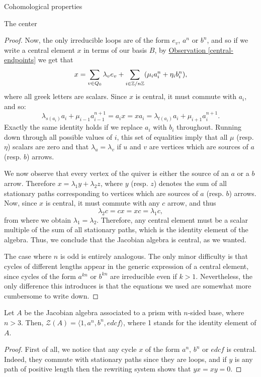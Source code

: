 \begin{chapter}{Cohomological properties}
\begin{section}{The center}
\begin{proof}
Now, the only irreducible loops are of the form $e_v$, $a^n$ or $b^n$, and so if we write a central element $x$ in terms of our basis $B$, by \hyperref[central-endpoints]{Observation \ref*{central-endpoints}} we get that
\[x = \sum_{v\in Q_0} \lambda_v e_v + \sum_{i\in \mathbb{Z}/n\mathbb{Z}}(\mu_i a_i^n + \eta_i b_i^n),\]
where all greek letters are scalars. Since $x$ is central, it must commute with $a_i$, and so:
\[\lambda_{s(a_i)}a_i + \mu_{i-1} a_{i-1}^{n+1}=a_ix = xa_i = \lambda_{t(a_i)}a_i + \mu_{i+1} a_i^{n+1}.\]
Exactly the same identity holds if we replace $a_i$ with $b_i$ throughout. Running down through all possible values of $i$, this set of equalities imply that all $\mu$ (resp. $\eta$) scalars are zero and that $\lambda_u=\lambda_v$ if $u$ and $v$ are vertices which are sources of $a$ (resp. $b$) arrows.

We now observe that every vertex of the quiver is either the source of an $a$ or a $b$ arrow. Therefore $x=\lambda_1 y + \lambda_2 z$, where $y$ (resp. $z$) denotes the sum of all stationary paths corresponding to vertices which are sources of $a$ (resp. $b$) arrows. Now, since $x$ is central, it must commute with any $c$ arrow, and thus
\[\lambda_2 c = cx = xc = \lambda_1 c,\]
from where we obtain $\lambda_1=\lambda_2$. Therefore, any central element must be a scalar multiple of the sum of all stationary paths, which is the identity element of the algebra. Thus, we conclude that the Jacobian algebra is central, as we wanted.

The case where $n$ is odd is entirely analogous. The only minor difficulty is that cycles of different lengths appear in the generic expression of a central element, since cycles of the form $a^{kn}$ or $b^{kn}$ are irreducible even if $k>1$. Nevertheless, the only difference this introduces is that the equations we used are somewhat more cumbersome to write down.
\end{proof}

\begin{prop} Let $A$ be the Jacobian algebra associated to a prism with $n$-sided base, where $n>3$. Then, $\mathcal{Z}(A) = \langle 1, a^n, b^n, edcf\rangle$, where 1 stands for the identity element of $A$.
\end{prop}
\begin{proof} First of all, we notice that any cycle $x$ of the form $a^n$, $b^n$ or $edcf$ is central. Indeed, they commute with stationary paths since they are loops, and if $y$ is any path of positive length then the rewriting system shows that $yx=xy=0$.


\end{proof}
\end{section}
\end{chapter}

